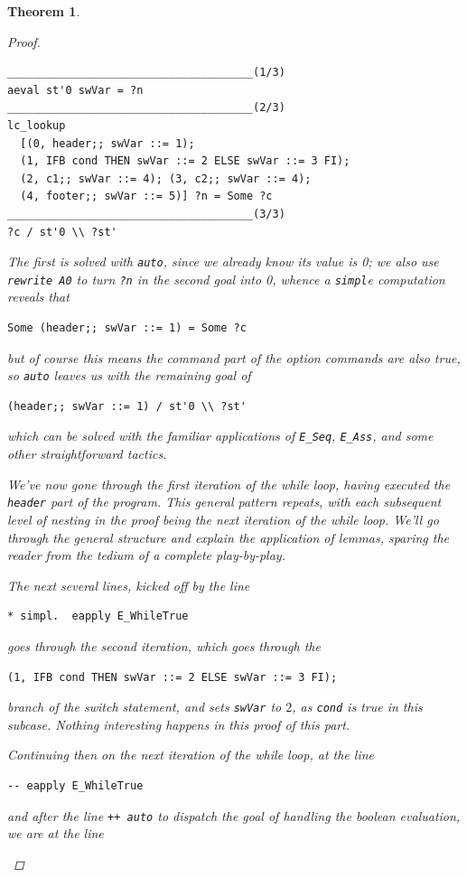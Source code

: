 \documentclass[12pt,notitlepage]{report}
\theoremstyle{plain}
\newtheorem{theo}{Theorem}[section]
\theoremstyle{definition}
\numberwithin{equation}{section}
\begin{document}
\begin{theo}
\begin{proof}
\begin{itemize}
\begin{itemize}
\begin{verbatim}
______________________________________(1/3)
aeval st'0 swVar = ?n
______________________________________(2/3)
lc_lookup
  [(0, header;; swVar ::= 1);
  (1, IFB cond THEN swVar ::= 2 ELSE swVar ::= 3 FI);
  (2, c1;; swVar ::= 4); (3, c2;; swVar ::= 4);
  (4, footer;; swVar ::= 5)] ?n = Some ?c
______________________________________(3/3)
?c / st'0 \\ ?st'\end{verbatim}
The first is solved with \verb$auto$, since we already know its value is 0; we also use \verb$rewrite A0$ to turn \verb$?n$ in the second goal into 0, whence a \verb$simpl$e computation reveals that
\begin{verbatim}
Some (header;; swVar ::= 1) = Some ?c
\end{verbatim}
but of course this means the command part of the option commands are also true, so \verb$auto$ leaves us with the remaining goal of
\begin{verbatim}
(header;; swVar ::= 1) / st'0 \\ ?st'
\end{verbatim}
which can be solved with the familiar applications of \verb$E_Seq$, \verb$E_Ass$, and some other straightforward tactics.
\par We've now gone through the first iteration of the while loop, having executed the \verb$header$ part of the program.  This general pattern repeats, with each subsequent level of nesting in the proof being the next iteration of the while loop.  We'll go through the general structure and explain the application of lemmas, sparing the reader from the tedium of a complete play-by-play.
\par The next several lines, kicked off by the line \begin{verbatim}* simpl.  eapply E_WhileTrue\end{verbatim} goes through the second iteration, which goes through the 
\begin{verbatim}
(1, IFB cond THEN swVar ::= 2 ELSE swVar ::= 3 FI);\end{verbatim}
branch of the switch statement, and sets \verb$swVar$ to $2$, as \verb$cond$ is true in this subcase.  Nothing interesting happens in this proof of this part.
\par Continuing then on the next iteration of the while loop, at the line
\begin{verbatim}
-- eapply E_WhileTrue
\end{verbatim}
and after the line \verb$++ auto$ to dispatch the goal of handling the boolean evaluation, we are at the line

\end{itemize}
\end{itemize}
\end{proof}
\end{theo}
\end{document}
